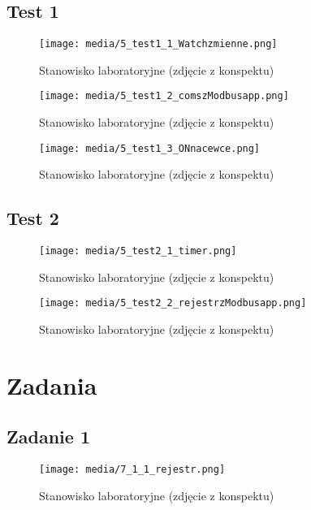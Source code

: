 \documentclass{article}
\begin{document}
\subsection{Test 1}


\begin{figure}[H]
    \centering
    \texttt{[image: media/5\_test1\_1\_Watchzmienne.png]}
    \caption{Stanowisko laboratoryjne (zdjęcie z konspektu)}
    \label{fig:zdj11}
\end{figure}


\begin{figure}[H]
    \centering
    \texttt{[image: media/5\_test1\_2\_comszModbusapp.png]}
    \caption{Stanowisko laboratoryjne (zdjęcie z konspektu)}
    \label{fig:zdj12}
\end{figure}


\begin{figure}[H]
    \centering
    \texttt{[image: media/5\_test1\_3\_ONnacewce.png]}
    \caption{Stanowisko laboratoryjne (zdjęcie z konspektu)}
    \label{fig:zdj13}
\end{figure}

\subsection{Test 2}


\begin{figure}[H]
    \centering
    \texttt{[image: media/5\_test2\_1\_timer.png]}
    \caption{Stanowisko laboratoryjne (zdjęcie z konspektu)}
    \label{fig:zdj14}
\end{figure}


\begin{figure}[H]
    \centering
    \texttt{[image: media/5\_test2\_2\_rejestrzModbusapp.png]}
    \caption{Stanowisko laboratoryjne (zdjęcie z konspektu)}
    \label{fig:zdj15}
\end{figure}

\newpage
\section{Zadania}
\subsection{Zadanie 1}

\begin{figure}[H]
    \centering
    \texttt{[image: media/7\_1\_1\_rejestr.png]}
    \caption{Stanowisko laboratoryjne (zdjęcie z konspektu)}
    \label{fig:zdj16}
\end{figure}
\end{document}
